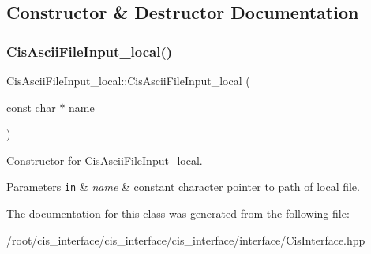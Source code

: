 \subsection{Constructor \& Destructor Documentation}
\mbox{\label{classCisAsciiFileInput__local_a6a503a34514e6c0bd5ba6429393b2629}} 
\subsubsection{\texorpdfstring{Cis\+Ascii\+File\+Input\+\_\+local()}{CisAsciiFileInput\_local()}}
{\footnotesize\ttfamily Cis\+Ascii\+File\+Input\+\_\+local\+::\+Cis\+Ascii\+File\+Input\+\_\+local (\begin{DoxyParamCaption}\item[{const char $\ast$}]{name }\end{DoxyParamCaption})\hspace{0.3cm}{\ttfamily [inline]}}



Constructor for \mbox{\hyperlink{classCisAsciiFileInput__local}{Cis\+Ascii\+File\+Input\+\_\+local}}. 


\begin{DoxyParams}[1]{Parameters}
\mbox{\tt in}  & {\em name} & constant character pointer to path of local file. \\
\hline
\end{DoxyParams}


The documentation for this class was generated from the following file\+:\begin{DoxyCompactItemize}
\item 
/root/cis\+\_\+interface/cis\+\_\+interface/cis\+\_\+interface/interface/Cis\+Interface.\+hpp\end{DoxyCompactItemize}
